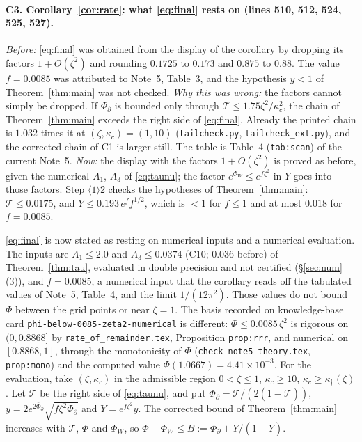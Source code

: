 \documentclass[11pt]{article}
\begin{document}
\paragraph{C3. Corollary~\ref{cor:rate}: what \eqref{eq:final} rests on (lines 510, 512, 524, 525,
527).}
\emph{Before:} \eqref{eq:final} was obtained from the display of the corollary by dropping its
factors $1+O(\zeta^2)$ and rounding $0.1725$ to $0.173$ and $0.875$ to $0.88$.  The value $f=0.0085$
was attributed to Note~5, Table~3, and the hypothesis $y<1$ of Theorem~\ref{thm:main} was not checked.
\emph{Why this was wrong:} the factors cannot simply be dropped.  If $\Phi_\partial$ is bounded only
through $\mathcal T\le1.75\zeta^2/\kappa_c^2$, the chain of Theorem~\ref{thm:main} exceeds the right
side of \eqref{eq:final}.  Already the printed chain is $1.032$ times it at $(\zeta,\kappa_c)=(1,10)$
(\texttt{tailcheck.py}, \texttt{tailcheck\_ext.py}), and the corrected chain of C1 is larger still.
The table is Table~4 (\texttt{tab:scan}) of the current Note~5.
\emph{Now:} the display with the factors $1+O(\zeta^2)$ is proved as before, given the numerical $A_1$, $A_3$ of \eqref{eq:taunu}; the factor
$e^{\Phi_W}\le e^{f\zeta^2}$ in $Y$ goes into those factors.  Step $\langle1\rangle2$ checks the
hypotheses of Theorem~\ref{thm:main}: $\mathcal T\le0.0175$, and $Y\le0.193\,e^{f}f^{1/2}$, which is
$<1$ for $f\le1$ and at most $0.018$ for $f=0.0085$.

\eqref{eq:final} is now stated as resting on numerical inputs and a numerical evaluation.  The inputs
are $A_1\le2.0$ and $A_3\le0.0374$ (C10; $0.036$ before) of Theorem~\ref{thm:tau}, evaluated in
double precision and not certified (\S\ref{sec:num}(3)), and $f=0.0085$, a numerical input that the
corollary reads off the tabulated values of Note~5, Table~4, and the limit $1/(12\pi^2)$.  Those
values do not bound $\Phi$ between the grid points or near $\zeta=1$.  The basis recorded on
knowledge-base card \texttt{phi-below-0085-zeta2-numerical} is different: $\Phi\le0.0085\,\zeta^2$
is rigorous on $(0,0.8868]$ by \texttt{rate\_of\_remainder.tex}, Proposition \texttt{prop:rrr}, and
numerical on $[0.8868,1]$, through the monotonicity of $\Phi$ (\texttt{check\_note5\_theory.tex},
\texttt{prop:mono}) and the computed value $\Phi(1.0667)=4.41\times10^{-3}$.  For the evaluation, take $(\zeta,\kappa_c)$ in the
admissible region $0<\zeta\le1$, $\kappa_c\ge10$, $\kappa_c\ge\kappa_\dagger(\zeta)$.  Let
$\bar{\mathcal T}$ be the right side of \eqref{eq:taunu}, and put
$\bar\Phi_\partial=\bar{\mathcal T}/(2(1-\bar{\mathcal T}))$,
$\bar y=2e^{2\bar\Phi_\partial}\sqrt{f\zeta^2\bar\Phi_\partial}$ and $\bar Y=e^{f\zeta^2}\bar y$.
The corrected bound of Theorem~\ref{thm:main} increases with $\mathcal T$, $\Phi$ and $\Phi_W$, so
$\Phi-\Phi_W\le B:=\bar\Phi_\partial+\bar Y/(1-\bar Y)$.
\end{document}
